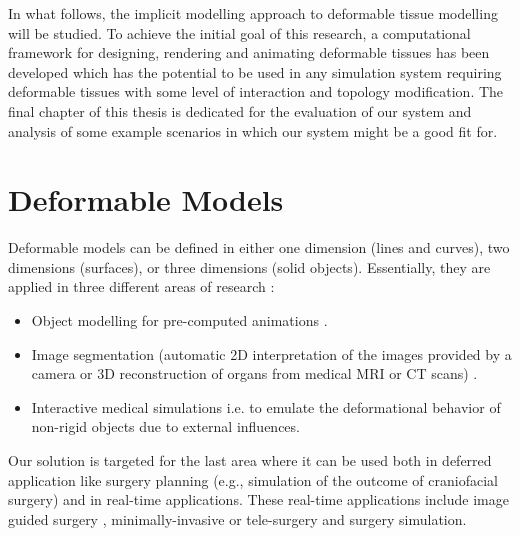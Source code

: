 In what follows, the implicit modelling approach to deformable tissue modelling will be studied. To achieve the initial goal of this research, a
computational framework for designing, rendering and animating deformable tissues has been developed which has the potential to be used in any 
simulation system requiring deformable tissues with some level of interaction and topology modification. The final chapter of this thesis is dedicated
for the evaluation of our system and analysis of some example scenarios in which our system might be a good fit for. 


\section{Deformable Models}
Deformable models can be defined in either one dimension (lines and curves), two dimensions (surfaces), or three dimensions (solid objects). 
Essentially, they are applied in three different areas of research \cite{Meier2005}: 

\begin{itemize}
 \item Object modelling for pre-computed animations \cite{coquillart1990extended, hsu1992direct}.
 \item Image segmentation (automatic 2D interpretation of the images provided by a camera or 3D reconstruction of organs from medical MRI 
 or CT scans) \cite{neveu1994recovery}.
 \item Interactive medical simulations i.e. to emulate the deformational behavior of non-rigid objects due to external influences.
\end{itemize}

Our solution is targeted for the last area where it can be used both in deferred application like surgery planning (e.g., simulation of the 
outcome of craniofacial surgery) \cite{bro1995modelling, keeve1996craniofacial} and in real-time applications. These real-time applications 
include image guided surgery \cite{Szekely2000}, minimally-invasive or tele-surgery and surgery simulation. 

